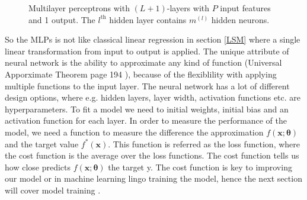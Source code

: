 \begin{figure}[th]
	\caption[Multilayer perceptrons with $(L+1)$-layers]{Multilayer perceptrons with $(L+1)$-layers with $P$ input features and 1 output. The $l^{\text{th}}$ hidden layer contains $m^{(l)}$ hidden neurons.}
	\label{fig:multilayer-perceptron}
\end{figure}

So the MLPs is not like classical linear regression in section \ref{LSM} where a single linear transformation from input to output is applied. The unique attribute of neural network is the ability to approximate any kind of function (Universal Apporximate Theorem page 194 \parencite{Goodfellow-et-al-2016}), because of the flexiblility with applying multiple functions to the input layer. The neural network has a lot of different design options, where e.g. hidden layers, layer width, activation functions etc. are hyperparameters. To fit a model we need to initial weights, initial bias and an activation function for each layer. In order to measure the performance of the model, we need a function to measure the difference the approximation $f(\bm{x};\bm{\theta})$ and the target value $f^*(\bm{x})$. This function is referred as the loss function, where the cost function is the average over the loss functions. The cost function tells us how close predicts $f(\bm{x};\bm{\theta})$ the target y. The cost function is key to improving our model or in machine learning lingo training the model, hence the next section will cover model training \parencite{Goodfellow-et-al-2016}.

